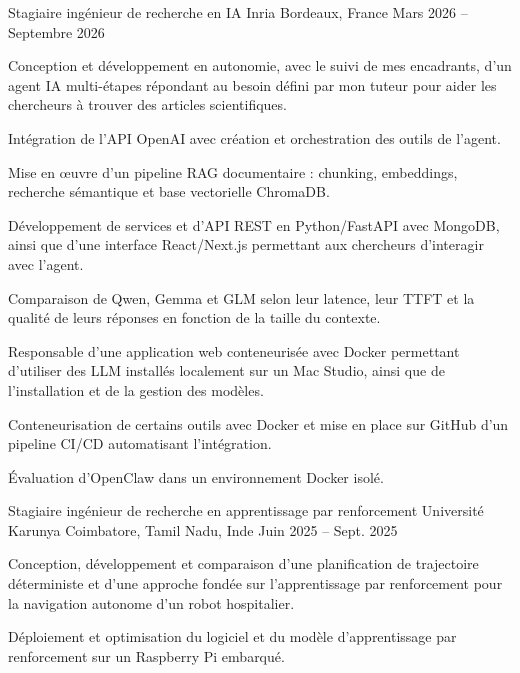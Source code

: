 
\begin{cventries}
  \cventry
    {Stagiaire ingénieur de recherche en IA}
    {Inria}
    {Bordeaux, France}
    {Mars 2026 -- Septembre 2026}
    {
      \begin{cvitems}
        \item {Conception et développement en autonomie, avec le suivi de mes encadrants, d’un agent IA multi-étapes répondant au besoin défini par mon tuteur pour aider les chercheurs à trouver des articles scientifiques.}
        \item {Intégration de l’API OpenAI avec création et orchestration des outils de l’agent.}
        \item {Mise en œuvre d’un pipeline RAG documentaire : chunking, embeddings, recherche sémantique et base vectorielle ChromaDB.}
        \item {Développement de services et d’API REST en Python/FastAPI avec MongoDB, ainsi que d’une interface React/Next.js permettant aux chercheurs d’interagir avec l’agent.}
        \item {Comparaison de Qwen, Gemma et GLM selon leur latence, leur TTFT et la qualité de leurs réponses en fonction de la taille du contexte.}
        \item {Responsable d’une application web conteneurisée avec Docker permettant d’utiliser des LLM installés localement sur un Mac Studio, ainsi que de l’installation et de la gestion des modèles.}
        \item {Conteneurisation de certains outils avec Docker et mise en place sur GitHub d’un pipeline CI/CD automatisant l’intégration.}
        \item {Évaluation d’OpenClaw dans un environnement Docker isolé.}
      \end{cvitems}
    }

  \cventry
    {Stagiaire ingénieur de recherche en apprentissage par renforcement}
    {Université Karunya}
    {Coimbatore, Tamil Nadu, Inde}
    {Juin 2025 -- Sept. 2025}
    {
      \begin{cvitems}
        \item {Conception, développement et comparaison d’une planification de trajectoire déterministe et d’une approche fondée sur l’apprentissage par renforcement pour la navigation autonome d’un robot hospitalier.}
        \item {Déploiement et optimisation du logiciel et du modèle d’apprentissage par renforcement sur un Raspberry Pi embarqué.}
      \end{cvitems}
    }
\end{cventries}
